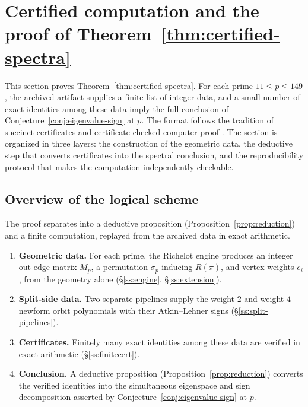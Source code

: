 \documentclass[10pt,a4paper]{amsart}
\begin{document}
	\section{Certified computation and the proof of Theorem~\ref{thm:certified-spectra}}
	\label{sec:certificates}
	
	This section proves Theorem~\ref{thm:certified-spectra}. For each prime $11\le p\le149$, the archived artifact supplies a finite list of integer data, and a small number of exact identities among these data imply the full conclusion of Conjecture~\ref{conj:eigenvalue-sign} at $p$. The format follows the
	tradition of succinct certificates and certificate-checked computer proof
	\cite{Pratt1975,AtkinMorain1993,RSST1997}. The section is organized in
	three layers: the construction of the geometric data, the deductive step
	that converts certificates into the spectral conclusion, and the
	reproducibility protocol that makes the computation independently
	checkable.
	
	\subsection{Overview of the logical scheme}
	\label{ss:cert-overview}
	
	The proof separates into a deductive proposition (Proposition~\ref{prop:reduction}) and a finite computation, replayed from the archived data in exact arithmetic.
	
	\begin{enumerate}[label=\textup{(\arabic*)},leftmargin=2.4em]
		\item \textbf{Geometric data.} For each prime, the Richelot engine produces
		an integer out-edge matrix $M_p$, a permutation $\sigma_p$ inducing
		$R(\pi)$, and vertex weights $e_i$, from the geometry alone
		(\S\ref{ss:engine}, \S\ref{ss:extension}).
		\item \textbf{Split-side data.} Two separate pipelines supply the weight-$2$
		and weight-$4$ newform orbit polynomials with their Atkin--Lehner signs
		(\S\ref{ss:split-pipelines}).
		\item \textbf{Certificates.} Finitely many exact identities among these
		data are verified in exact arithmetic (\S\ref{ss:finitecert}).
		\item \textbf{Conclusion.} A deductive proposition
		(Proposition~\ref{prop:reduction}) converts the verified identities into
		the simultaneous eigenspace and sign decomposition asserted by
		Conjecture~\ref{conj:eigenvalue-sign} at $p$.
	\end{enumerate}
	
\end{document}
